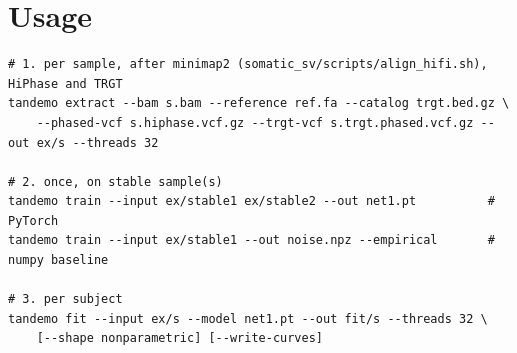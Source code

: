 \documentclass[10pt,a4paper]{article}
\begin{document}
\section{Usage}
\begin{verbatim}
# 1. per sample, after minimap2 (somatic_sv/scripts/align_hifi.sh), HiPhase and TRGT
tandemo extract --bam s.bam --reference ref.fa --catalog trgt.bed.gz \
    --phased-vcf s.hiphase.vcf.gz --trgt-vcf s.trgt.phased.vcf.gz --out ex/s --threads 32

# 2. once, on stable sample(s)
tandemo train --input ex/stable1 ex/stable2 --out net1.pt          # PyTorch
tandemo train --input ex/stable1 --out noise.npz --empirical       # numpy baseline

# 3. per subject
tandemo fit --input ex/s --model net1.pt --out fit/s --threads 32 \
    [--shape nonparametric] [--write-curves]
\end{verbatim}
\end{document}
